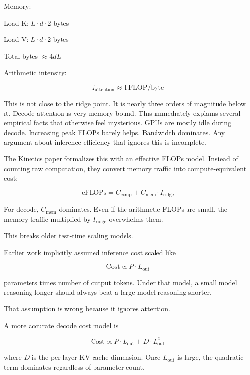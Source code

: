 \documentclass[12pt]{article}
\begin{document}
Memory:

Load K: $L \cdot d \cdot 2$ bytes

Load V: $L \cdot d \cdot 2$ bytes

Total bytes $\approx 4 d L$

Arithmetic intensity:

\begin{equation}
I_\text{attention} \approx 1 \, \text{FLOP/byte}
\end{equation}

This is not close to the ridge point. It is nearly three orders of magnitude below it. Decode attention is very memory bound. This immediately explains several empirical facts that otherwise feel mysterious. GPUs are mostly idle during decode. Increasing peak FLOPs barely helps. Bandwidth dominates. Any argument about inference efficiency that ignores this is incomplete.

The Kinetics paper formalizes this with an effective FLOPs model. Instead of counting raw computation, they convert memory traffic into compute-equivalent cost:

\begin{equation}
\text{eFLOPs} = C_\text{comp} + C_\text{mem} \cdot I_\text{ridge}
\end{equation}

For decode, $C_\text{mem}$ dominates. Even if the arithmetic FLOPs are small, the memory traffic multiplied by $I_\text{ridge}$ overwhelms them.

This breaks older test-time scaling models.

Earlier work implicitly assumed inference cost scaled like

\begin{equation}
\text{Cost} \propto P \cdot L_\text{out}
\end{equation}

parameters times number of output tokens. Under that model, a small model reasoning longer should always beat a large model reasoning shorter.

That assumption is wrong because it ignores attention.

A more accurate decode cost model is

\begin{equation}
\text{Cost} \propto P \cdot L_\text{out} + D \cdot L_\text{out}^2
\end{equation}

where $D$ is the per-layer KV cache dimension. Once $L_\text{out}$ is large, the quadratic term dominates regardless of parameter count.
\end{document}
